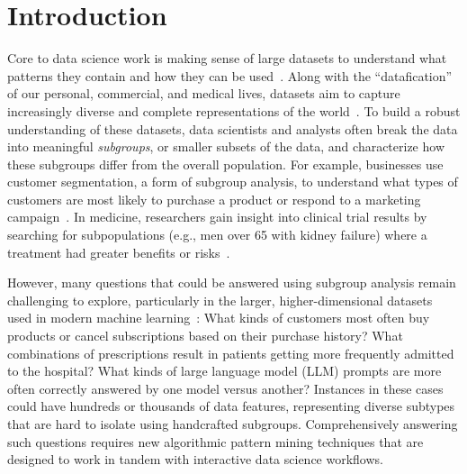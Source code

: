 \section{Introduction}

Core to data science work is making sense of large datasets to understand what patterns they contain and how they can be used~\cite{cao_data_2018}.
Along with the ``datafication'' of our personal, commercial, and medical lives, datasets aim to capture increasingly diverse and complete representations of the world~\cite{lycett_datafication_2013}.
To build a robust understanding of these datasets, data scientists and analysts often break the data into meaningful \textit{subgroups}, or smaller subsets of the data, and characterize how these subgroups differ from the overall population.
For example, businesses use customer segmentation, a form of subgroup analysis, to understand what types of customers are most likely to purchase a product or respond to a marketing campaign~\cite{noauthor_customer_2024}.
In medicine, researchers gain insight into clinical trial results by searching for subpopulations (e.g., men over 65 with kidney failure) where a treatment had greater benefits or risks~\cite{wang_statistics_2007}.

However, many questions that could be answered using subgroup analysis remain challenging to explore, particularly in the larger, higher-dimensional datasets used in modern machine learning~\cite{helal_subgroup_2016}:
What kinds of customers most often buy products or cancel subscriptions based on their purchase history?
What combinations of prescriptions result in patients getting more frequently admitted to the hospital?
What kinds of large language model (LLM) prompts are more often correctly answered by one model versus another?
Instances in these cases could have hundreds or thousands of data features, representing diverse subtypes that are hard to isolate using handcrafted subgroups.
Comprehensively answering such questions requires new algorithmic pattern mining techniques that are designed to work in tandem with interactive data science workflows.

